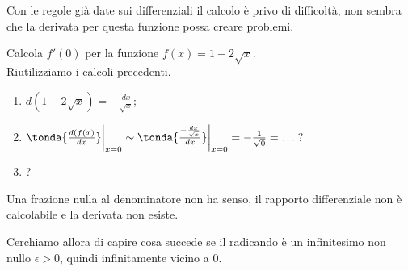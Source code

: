 Con le regole già date sui differenziali il calcolo è privo di difficoltà, non 
sembra che la derivata per questa funzione possa creare problemi.

\begin{esempio}
  \label{esempio:diff01_deriradice}
Calcola $f'(0)$ per la funzione $f(x)=1-2\sqrt{x}$.\\
Riutilizziamo i calcoli precedenti.
\begin{enumerate} [noitemsep]
 \item $d(1-2\sqrt{x})=-\frac{dx}{\sqrt{x}}$;
 \item $\tonda{\frac{d(f(x)}{dx}}\bigg|_{x=0}\sim
  \tonda{\frac{-\frac{dx}{\sqrt{x}}}{dx}}\bigg|_{x=0}=-\frac{1}{\sqrt{0}}=
  \dots$?
 \item ?
\end{enumerate}
Una frazione nulla al denominatore non ha senso, il rapporto differenziale non 
è calcolabile e la derivata non esiste. 
\end{esempio}

Cerchiamo allora di capire cosa succede se il radicando è un infinitesimo non 
nullo $\epsilon>0$, quindi infinitamente vicino a 0.

